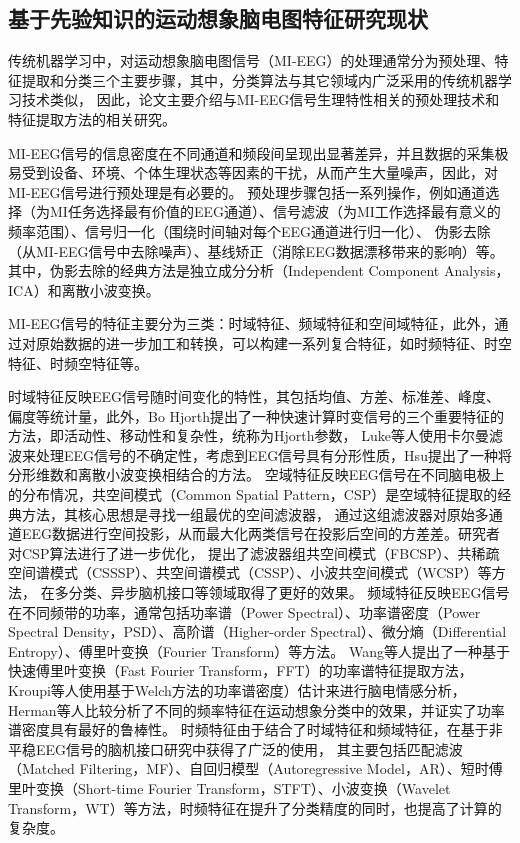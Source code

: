 \subsection{基于先验知识的运动想象脑电图特征研究现状}

传统机器学习中，对运动想象脑电图信号（MI-EEG）的处理通常分为预处理、特征提取和分类三个主要步骤\cite{altaheri2023deep}，其中，分类算法与其它领域内广泛采用的传统机器学习技术类似，
因此，论文主要介绍与MI-EEG信号生理特性相关的预处理技术和特征提取方法的相关研究。

MI-EEG信号的信息密度在不同通道和频段间呈现出显著差异，并且数据的采集极易受到设备、环境、个体生理状态等因素的干扰，从而产生大量噪声，因此，对MI-EEG信号进行预处理是有必要的。
预处理步骤包括一系列操作，例如通道选择（为MI任务选择最有价值的EEG通道）、信号滤波（为MI工作选择最有意义的频率范围）、信号归一化（围绕时间轴对每个EEG通道进行归一化）、
伪影去除（从MI-EEG信号中去除噪声）\cite{altaheri2023deep}、基线矫正（消除EEG数据漂移带来的影响）等。
其中，伪影去除的经典方法是独立成分分析（Independent Component Analysis，ICA）和离散小波变换\cite{sai2017automated}。

MI-EEG信号的特征主要分为三类：时域特征、频域特征和空间域特征\cite{altaheri2023deep}，此外，通过对原始数据的进一步加工和转换，可以构建一系列复合特征，如时频特征、时空特征、时频空特征等。

时域特征反映EEG信号随时间变化的特性，其包括均值、方差、标准差、峰度、偏度等统计量，此外，Bo Hjorth提出了一种快速计算时变信号的三个重要特征的方法，即活动性、移动性和复杂性，统称为Hjorth参数\cite{HJORTH1970306}，
Luke等人使用卡尔曼滤波来处理EEG信号的不确定性\cite{7448410}，考虑到EEG信号具有分形性质，Hsu提出了一种将分形维数和离散小波变换相结合的方法\cite{HSU2010295}。
空域特征反映EEG信号在不同脑电极上的分布情况，共空间模式（Common Spatial Pattern，CSP）是空域特征提取的经典方法，其核心思想是寻找一组最优的空间滤波器，
通过这组滤波器对原始多通道EEG数据进行空间投影，从而最大化两类信号在投影后空间的方差差\cite{wang2006common}。研究者对CSP算法进行了进一步优化，
提出了滤波器组共空间模式（FBCSP）\cite{ang2008filter}、共稀疏空间谱模式（CSSSP）\cite{dornhege2006combined}、共空间谱模式（CSSP）\cite{lemm2005spatio}、小波共空间模式（WCSP）\cite{mousavi2011wavelet}等方法，
在多分类、异步脑机接口等领域取得了更好的效果。
频域特征反映EEG信号在不同频带的功率，通常包括功率谱（Power Spectral）、功率谱密度（Power Spectral Density，PSD）、高阶谱（Higher-order Spectral）、微分熵（Differential Entropy）、傅里叶变换（Fourier Transform）等方法。
Wang等人提出了一种基于快速傅里叶变换（Fast Fourier Transform，FFT）的功率谱特征提取方法\cite{wang2017tinnitus}，Kroupi等人使用基于Welch方法的功率谱密度）估计来进行脑电情感分析\cite{kroupi2011eeg}，
Herman等人比较分析了不同的频率特征在运动想象分类中的效果，并证实了功率谱密度具有最好的鲁棒性\cite{herman2008comparative}。
时频特征由于结合了时域特征和频域特征，在基于非平稳EEG信号的脑机接口研究中获得了广泛的使用\cite{pawar2020feature}，
其主要包括匹配滤波（Matched Filtering，MF）、自回归模型（Autoregressive Model，AR）、短时傅里叶变换（Short-time Fourier Transform，STFT）、小波变换（Wavelet Transform，WT）等方法，时频特征在提升了分类精度的同时，也提高了计算的复杂度。

